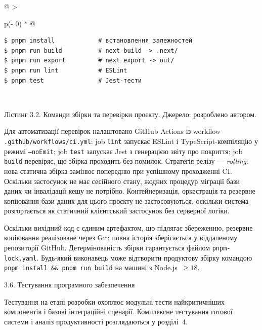 \begin{longtable}[]{@{}
  >{\raggedright\arraybackslash}p{}@{}}
\caption{Команди збірки та перевірки проєкту. Джерело: розроблено
автором.}\tabularnewline
\toprule\noalign{}
\endfirsthead
\endhead
\bottomrule\noalign{}
\endlastfoot
\begin{minipage}[t]{\linewidth}\raggedright
\begin{verbatim}
$ pnpm install            # встановлення залежностей
$ pnpm run build          # next build -> .next/
$ pnpm run export         # next export -> out/
$ pnpm run lint           # ESLint
$ pnpm test               # Jest-тести
\end{verbatim}
\end{minipage} \\
\end{longtable}

Лістинг 3.2. Команди збірки та перевірки проєкту. Джерело: розроблено автором.

Для автоматизації перевірок налаштовано GitHub Actions із workflow
\texttt{.github/workflows/ci.yml}: job \texttt{lint} запускає ESLint і
TypeScript-компіляцію у режимі \texttt{--noEmit}; job \texttt{test}
запускає Jest з генерацією звіту про покриття; job \texttt{build}
перевіряє, що збірка проходить без помилок. Стратегія релізу ---
\emph{rolling}: нова статична збірка замінює попередню при успішному
проходженні CI. Оскільки застосунок не має сесійного стану, жодних
процедур міграції бази даних чи інвалідації кешу не потрібно.
Контейнеризація, оркестрація та резервне копіювання бази даних для цього
проєкту не застосовуються, оскільки система розгортається як статичний
клієнтський застосунок без серверної логіки.

Оскільки вихідний код є єдиним артефактом, що підлягає збереженню,
резервне копіювання реалізоване через Git: повна історія зберігається у
віддаленому репозиторії GitHub. Детермінованість збірки гарантується
файлом \texttt{pnpm-lock.yaml}. Будь-який виконавець може відтворити
продуктову збірку командою \texttt{pnpm install \&\& pnpm run build} на
машині з Node.js~\(\geq18\).

\protect{}\label{_Toc229681157}{}3.6. Тестування програмного
забезпечення

Тестування на етапі розробки охоплює модульні тести найкритичніших
компонентів і базові інтеграційні сценарії. Комплексне тестування готової
системи і аналіз продуктивності розглядаються у розділі~4.

